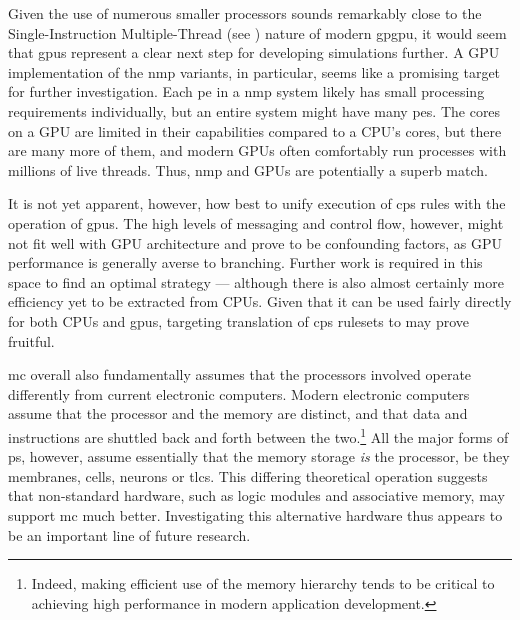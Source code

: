 Given the use of numerous smaller processors sounds remarkably close to the Single-Instruction Multiple-Thread (see \cite[Ch. 4.4.1]{Hennessy2012}) nature of modern \gls{gpgpu}, it would seem that \glspl{gpu} represent a clear next step for developing simulations further.  A GPU implementation of the \gls{nmp} variants, in particular, seems like a promising target for further investigation.  Each \gls{pe} in a \gls{nmp} system likely has small processing requirements individually, but an entire system might have many \glspl{pe}.  The cores on a GPU are limited in their capabilities compared to a CPU's cores, but there are many more of them, and modern GPUs often comfortably run processes with millions of live threads.  Thus, \gls{nmp} and GPUs are potentially a superb match.

It is not yet apparent, however, how best to unify execution of \gls{cps} rules with the operation of \glspl{gpu}.  The high levels of messaging and control flow, however, might not fit well with GPU architecture and prove to be confounding factors, as GPU performance is generally averse to branching.  Further work is required in this space to find an optimal strategy --- although there is also almost certainly more efficiency yet to be extracted from CPUs.  Given that it can be used fairly directly for both CPUs and \glspl{gpu}, targeting translation of \gls{cps} \glspl{ruleset} to  may prove fruitful.

\Gls{mc} overall also fundamentally assumes that the processors involved operate differently from current electronic computers.  Modern electronic computers assume that the processor and the memory are distinct, and that data and instructions are shuttled back and forth between the two.\footnote{Indeed, making efficient use of the memory hierarchy tends to be critical to achieving high performance in modern application development.}  All the major forms of \gls{ps}, however, assume essentially that the memory storage \emph{is} the processor, be they membranes, cells, neurons or \glspl{tlc}.  This differing theoretical operation suggests that non-standard hardware, such as logic modules and associative memory, may support \gls{mc} much better.  Investigating this alternative hardware thus appears to be an important line of future research.



